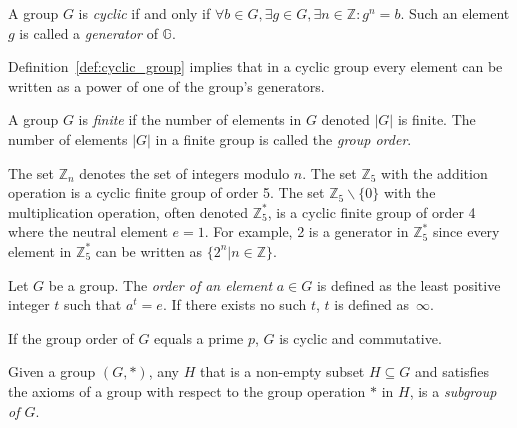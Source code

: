 \begin{defn}
\label{def:cyclic_group}
 A group $G$ is \textit{cyclic} if and only if $\forall b \in G, \exists g \in G,\exists n \in \mathbb{Z}: g^n = b$. Such an element $g$ is called a \textit{generator} of $\mathbb{G}$.
\end{defn}

Definition~\ref{def:cyclic_group} implies that in a cyclic group every element can be written as a power of one of the group's generators.

\begin{defn}
\label{def:finite_group}
 A group $G$ is \textit{finite} if the number of elements in $G$ denoted $|G|$ is finite. The number of elements $|G|$ in a finite group is called the \textit{group order}.
\end{defn}

The set $\mathbb{Z}_n$ denotes the set of integers modulo $n$. The set $\mathbb{Z}_5$ with the addition operation is a cyclic finite group of order 5. The set $\mathbb{Z}_5 \backslash \{0\}$ with the multiplication operation, often denoted $\mathbb{Z}^{*}_5$, is a cyclic finite group of order 4 where the neutral element $e=1$. For example, 2 is a generator in $\mathbb{Z}^{*}_5$ since every element in $\mathbb{Z}^{*}_5$ can be written as $\{ 2^n | n \in \mathbb{Z} \}$.

\begin{defn}
\label{def:order_of_an_element}
Let $G$ be a group. The \textit{order of an element} $a \in G$ is defined as the least positive integer $t$ such that $a^t = e$. If there exists no such $t$, $t$ is defined as~$\infty$.
\end{defn}

\begin{thm}
\label{the:group_modulo_a_prime}
If the group order of $G$ equals a prime $p$, $G$ is cyclic and commutative.
\end{thm}

\begin{defn}[Subgroup]
\label{def:subgroup}
 Given a group $\left( G, * \right)$, any $H$ that is a non-empty subset $H \subseteq G$ and satisfies the axioms of a group with respect to the group operation $*$ in $H$, is a \textit{subgroup of $G$}.
\end{defn}

